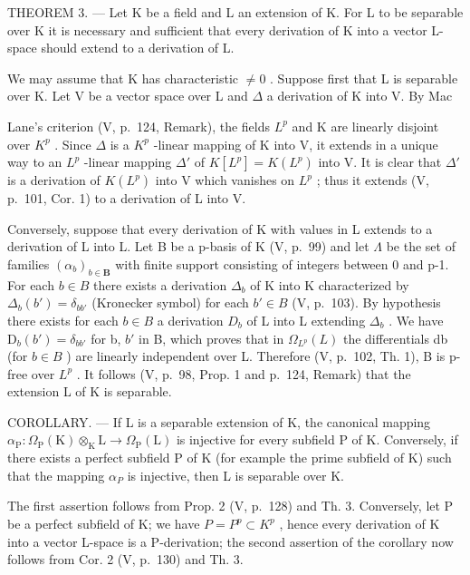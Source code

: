 THEOREM 3. --- Let K be a field and L an extension of K. For L to be separable over K it is necessary and sufficient that every derivation of K into a vector L-space should extend to a derivation of L.

We may assume that K has characteristic \(\neq0\) . Suppose first that L is separable over K. Let V be a vector space over L and \(\Delta\) a derivation of K into V. By Mac

Lane's criterion (V, p.~124, Remark), the fields \(L^p\) and K are linearly disjoint over \(K^p\) . Since \(\Delta\) is a \(K^p\) -linear mapping of K into V, it extends in a unique way to an \(L^p\) -linear mapping \(\Delta'\) of \(K[L^p] = K(L^p)\) into V. It is clear that \(\Delta'\) is a derivation of \(K(L^p)\) into V which vanishes on \(L^p\) ; thus it extends (V, p.~101, Cor. 1) to a derivation of L into V.

Conversely, suppose that every derivation of K with values in L extends to a derivation of L into L. Let B be a p-basis of K (V, p.~99) and let \(\Lambda\) be the set of families \((\alpha_{b})_{b\in\mathbf{B}}\) with finite support consisting of integers between 0 and p-1. For each \(b\in B\) there exists a derivation \(\Delta_{b}\) of K into K characterized by \(\Delta_{b}(b')=\delta_{bb'}\) (Kronecker symbol) for each \(b'\in B\) (V, p.~103). By hypothesis there exists for each \(b\in B\) a derivation \(D_{b}\) of L into L extending \(\Delta_{b}\) . We have \(\mathrm{D}_{b}(b')=\delta_{bb'}\) for b, \(b'\) in B, which proves that in \(\Omega_{L^{p}}(L)\) the differentials db (for \(b\in B\) ) are linearly independent over L. Therefore (V, p.~102, Th. 1), B is p-free over \(L^{p}\) . It follows (V, p.~98, Prop. 1 and p.~124, Remark) that the extension L of K is separable.

COROLLARY. --- If L is a separable extension of K, the canonical mapping \(\alpha_{\mathrm{P}}:\Omega_{\mathrm{P}}(\mathrm{K})\otimes_{\mathrm{K}}\mathrm{L}\to\Omega_{\mathrm{P}}(\mathrm{L})\) is injective for every subfield P of K. Conversely, if there exists a perfect subfield P of K (for example the prime subfield of K) such that the mapping \(\alpha_{P}\) is injective, then L is separable over K.

The first assertion follows from Prop. 2 (V, p.~128) and Th. 3. Conversely, let P be a perfect subfield of K; we have \(P = P^{p} \subset K^{p}\) , hence every derivation of K into a vector L-space is a P-derivation; the second assertion of the corollary now follows from Cor. 2 (V, p.~130) and Th. 3.

